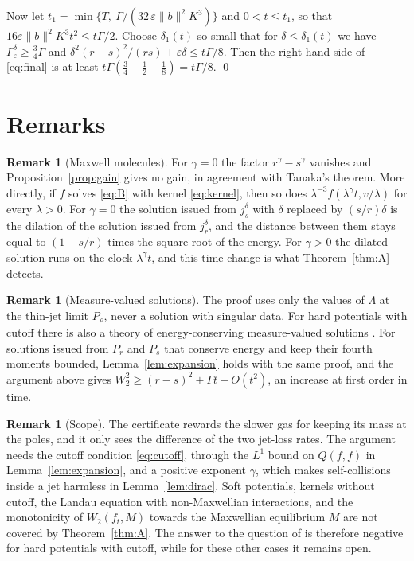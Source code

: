 \documentclass[11pt]{amsart}
\theoremstyle{definition}
\newtheorem{remark}[theorem]{Remark}
\newcommand{\nb}{\|b\|}
\begin{document}
Now let $t_1=\min\{T,\ \Gamma/(32\,\varepsilon\nb^2K^3)\}$ and $0<t\le t_1$, so that $16\varepsilon\nb^2K^3t^2\le t\Gamma/2$. Choose $\delta_1(t)$ so small that for $\delta\le\delta_1(t)$ we have $\Gamma^\delta_\varepsilon\ge\frac34\Gamma$ and $\delta^2(r-s)^2/(rs)+\varepsilon\delta\le t\Gamma/8$. Then the right-hand side of \eqref{eq:final} is at least $t\Gamma(\frac34-\frac12-\frac18)=t\Gamma/8$. \qed

\section{Remarks}\label{sec:remarks}

\begin{remark}[Maxwell molecules]
For $\gamma=0$ the factor $r^\gamma-s^\gamma$ vanishes and Proposition~\ref{prop:gain} gives no gain, in agreement with Tanaka's theorem. More directly, if $f$ solves \eqref{eq:B} with kernel \eqref{eq:kernel}, then so does $\lambda^{-3}f(\lambda^\gamma t,v/\lambda)$ for every $\lambda>0$. For $\gamma=0$ the solution issued from $j^\delta_s$ with $\delta$ replaced by $(s/r)\delta$ is the dilation of the solution issued from $j^\delta_r$, and the distance between them stays equal to $(1-s/r)$ times the square root of the energy. For $\gamma>0$ the dilated solution runs on the clock $\lambda^\gamma t$, and this time change is what Theorem~\ref{thm:A} detects.
\end{remark}

\begin{remark}[Measure-valued solutions]
The proof uses only the values of $\Lambda$ at the thin-jet limit $P_\rho$, never a solution with singular data. For hard potentials with cutoff there is also a theory of energy-conserving measure-valued solutions \cite{LM12}. For solutions issued from $P_r$ and $P_s$ that conserve energy and keep their fourth moments bounded, Lemma~\ref{lem:expansion} holds with the same proof, and the argument above gives $W_2^2\ge(r-s)^2+\Gamma t-O(t^2)$, an increase at first order in time.
\end{remark}

\begin{remark}[Scope]
The certificate rewards the slower gas for keeping its mass at the poles, and it only sees the difference of the two jet-loss rates. The argument needs the cutoff condition \eqref{eq:cutoff}, through the $L^1$ bound on $Q(f,f)$ in Lemma~\ref{lem:expansion}, and a positive exponent $\gamma$, which makes self-collisions inside a jet harmless in Lemma~\ref{lem:dirac}. Soft potentials, kernels without cutoff, the Landau equation with non-Maxwellian interactions, and the monotonicity of $W_2(f_t,M)$ towards the Maxwellian equilibrium $M$ are not covered by Theorem~\ref{thm:A}. The answer to the question of \cite{Vil25} is therefore negative for hard potentials with cutoff, while for these other cases it remains open.
\end{remark}
\end{document}
